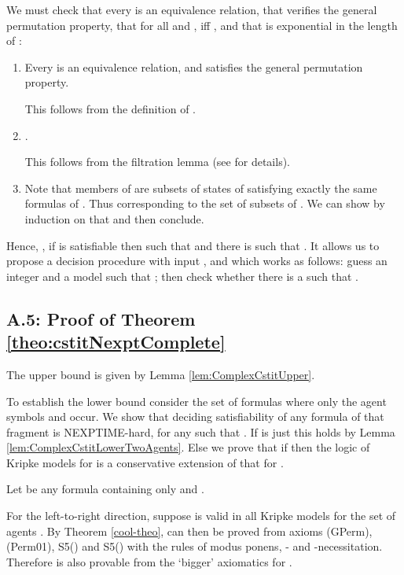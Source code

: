 \documentclass{article}
\newcommand{\LCSTIT}{}
\begin{document}
We must check that every  is an equivalence relation,
that  verifies the general permutation property,
that for all  and ,
 iff , and
that  is exponential in the length of :
\begin{enumerate}
\item Every  is an equivalence relation, and
 satisfies the general permutation property.

This follows from the definition of .

\item .

This follows from the filtration lemma (see \cite{Blackburn:2001:ML} for details).


\item 

Note that members of  are subsets of states of  satisfying
exactly the same formulas of .
Thus  corresponding to the set
of subsets of .
We can show by induction on  that 
and then conclude.

\end{enumerate}

Hence,  \LCSTIT,
if  is satisfiable then
 such that  and
there is  such that .
It allows us to propose a decision procedure with input  \LCSTIT,
and which works as follows:
guess an integer  and a model 
such that ;
then check whether there is a  such that .




\subsection*{A.5: Proof of Theorem \ref{theo:cstitNexptComplete}}

The upper bound is given by Lemma \ref{lem:ComplexCstitUpper}.

To establish the lower bound consider 
the set of formulas where only the agent symbols  and  occur.
We show that deciding satisfiability of any formula of that fragment
is NEXPTIME-hard, for any  such that .
If  is just  this holds
by Lemma \ref{lem:ComplexCstitLowerTwoAgents}.
Else we prove that if  then
the logic of Kripke models for  is a conservative extension of
that for .


Let  be any formula containing only  and .

For the left-to-right direction, suppose  is valid in all Kripke models
for the set of agents .
By Theorem \ref{cool-theo},  can then be proved from
axioms (GPerm), (Perm01), S5() and S5() with
the rules of modus ponens, - and  -necessitation.
Therefore  is also provable from the `bigger' axiomatics for .
\end{document}

